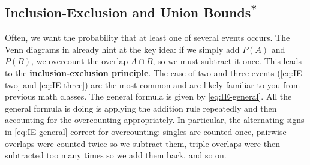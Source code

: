 

\subsection{\texorpdfstring{Inclusion-Exclusion and Union Bounds\textsuperscript{*}}{Inclusion-Exclusion and Union Bounds}}
Often, we want the probability that at least one of several events occurs. The Venn diagrams in  already hint at the key idea: if we simply add $P(A)$ and $P(B)$, we overcount the overlap $A\cap B$, so we must subtract it once. This leads to the \textbf{inclusion-exclusion principle}. The case of two and three events (\autoref{eq:IE-two} and \autoref{eq:IE-three}) are the most common and are likely familiar to you from previous math classes. The general formula is given by \autoref{eq:IE-general}. All the general formula is doing is applying the addition rule repeatedly and then accounting for the overcounting appropriately. In particular, the alternating signs in \autoref{eq:IE-general} correct for overcounting: singles are counted once, pairwise overlaps were counted twice so we subtract them, triple overlaps were then subtracted too many times so we add them back, and so on.

